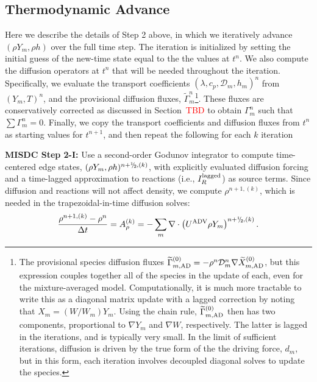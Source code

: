 \subsection{Thermodynamic Advance}\label{sec:Thermodynamic Advance}
Here we describe the details of Step 2 above, in
which we iteratively advance $(\rho Y_m,\rho h)$ over the full time step.  The iteration is initialized by
setting the initial guess of the new-time state equal to the the values at $t^n$.  We also compute the diffusion
operators at $t^n$ that will be needed throughout the iteration.  Specifically, we evaluate the transport coefficients
$(\lambda,c_p,\mathcal D_m,h_m)^n$ from $(Y_m,T)^n$, and the provisional diffusion fluxes,
$\widetilde\Gamma_m^n$\footnote{The provisional species diffusion fluxes $\widetilde\Gamma_{m,{\rm AD}}^{(0)} = -\rho^n\mathcal D_m^n\nabla\widetilde X_{m,{\rm AD}}^{(0)}$, but this expression couples together all of the species in the update of each, even for the mixture-averaged model. Computationally, it is much more tractable to write this as a diagonal matrix update with a lagged correction by noting that $X_m = (W/W_m)Y_m$.  Using the chain rule, $\widetilde\Gamma_{m,{\rm AD}}^{(0)}$ then has two components, proportional to $\nabla Y_m$ and $\nabla W$, respectively. The latter is lagged in the iterations, and is typically very small. In the limit of sufficient iterations, diffusion is driven by the true form of the the driving force, $d_m$, but in this form, each iteration involves decoupled diagonal solves to update the species.}.  These fluxes are conservatively
corrected as discussed in Section~\textcolor{red}{TBD} to obtain $\Gamma_m^n$ such that $\sum \Gamma_m^n = 0$.
Finally, we copy the transport coefficients and diffusion fluxes from $t^n$ as starting values for $t^{n+1}$, and
then repeat the following for each $k$ iteration

{\bf MISDC Step 2-I:} Use a second-order Godunov integrator to compute 
time-centered edge states, $(\rho Y_m,\rho h)^{n+\myhalf,(k)}$, with explicitly evaluated diffusion
forcing and a time-lagged approximation to reactions (i.e., $I_R^{\rm lagged}$) as source terms.
Since diffusion and reactions will not affect density, we compute $\rho^{n+1,(k)}$, which is needed in the trapezoidal-in-time
diffusion solves:
\begin{equation}
\frac{\rho^{n+1,(k)} - \rho^n}{\Delta t} = A_{\rho}^{(k)} = -\sum_m\nabla\cdot\left(\uadv\rho Y_m\right)^{n+\myhalf,(k)}.
\end{equation}

